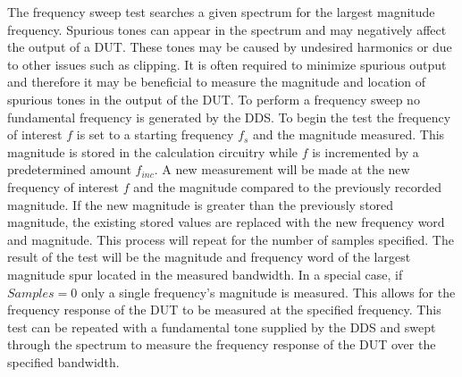 \documentclass[12pt]{report}
\begin{document}
The frequency sweep test searches a given spectrum for the largest magnitude frequency.  Spurious tones can appear in the spectrum and may negatively affect the output of a DUT.  These tones may be caused by undesired harmonics or due to other issues such as clipping.  It is often required to minimize spurious output and therefore it may be beneficial to measure the magnitude and location of spurious tones in the output of the DUT\cite{joey}.  To perform a frequency sweep no fundamental frequency is generated by the DDS.  To begin the test the frequency of interest $f$ is set to a starting frequency $f_s$ and the magnitude measured.  This magnitude is stored in the calculation circuitry while $f$ is incremented by a predetermined amount $f_{inc}$.  A new measurement will be made at the new frequency of interest $f$ and the magnitude compared to the previously recorded magnitude.  If the new magnitude is greater than the previously stored magnitude, the existing stored values are replaced with the new frequency word and magnitude.  This process will repeat for the number of samples specified.  The result of the test will be the magnitude and frequency word of the largest magnitude spur located in the measured bandwidth\cite{joey}.  In a special case, if $Samples = 0$ only a single frequency's magnitude is measured.  This allows for the frequency response of the DUT to be measured at the specified frequency.  This test can be repeated with a fundamental tone supplied by the DDS and swept through the spectrum to measure the frequency response of the DUT over the specified bandwidth\cite{stroud-automaticlinearity}.
\end{document}

